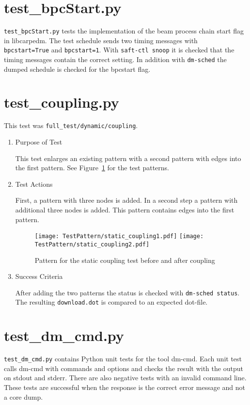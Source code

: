 \documentclass[12pt,a4paper]{report}
\begin{document}
\section{test\_bpcStart.py}
\texttt{test\_bpcStart.py} tests the implementation of the beam process chain start flag in libcarpedm.
The test schedule sends two timing messages with \\
\texttt{bpcstart=True} and \texttt{bpcstart=1}.
With \texttt{saft-ctl snoop} it is checked that the timing messages contain the correct setting.
In addition with \texttt{dm-sched} the dumped schedule is checked for the bpcstart flag.
\section{test\_coupling.py}
This test was \texttt{full\_test/dynamic/coupling}.
\begin{enumerate}
  \item Purpose of Test

  This test enlarges an existing pattern with a second pattern with edges into the first
  pattern. See Figure~\ref{fig:Pattern_for_the_static_coupling_test} for the test patterns.
  \item Test Actions

  First, a pattern with three nodes is added. In a second step a pattern with additional three nodes is added.
  This pattern contains edges into the first pattern.
    \begin{figure}
        \centering
        \texttt{[image: TestPattern/static\_coupling1.pdf]}
        \texttt{[image: TestPattern/static\_coupling2.pdf]}
        \caption{Pattern for the static coupling test before and after coupling}
        \label{fig:Pattern_for_the_static_coupling_test}
    \end{figure}
  \item Success Criteria

  After adding the two patterns the status is checked with \texttt{dm-sched status}. The resulting \texttt{download.dot} is
  compared to an expected dot-file.
\end{enumerate}

\section{test\_dm\_cmd.py}
\texttt{test\_dm\_cmd.py} contains Python unit tests for the tool dm-cmd.
Each unit test calls dm-cmd with commands and options and checks the result
with the output on stdout and stderr. There are also negative tests with
an invalid command line. These tests are successful when the response is
the correct error message and not a core dump.
\end{document}
